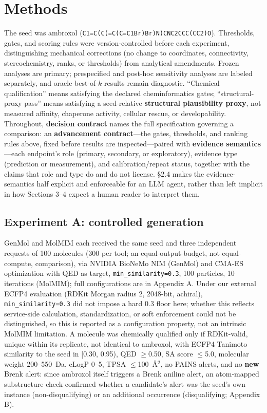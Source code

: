\documentclass{article}
\begin{document}
\section{Methods}

The seed was ambroxol (\texttt{C1=C(C(=C(C=C1Br)Br)N)CNC2CCC(CC2)O}). Thresholds, gates, and scoring rules were version-controlled before each experiment, distinguishing mechanical corrections (no change to coordinates, connectivity, stereochemistry, ranks, or thresholds) from analytical amendments. Frozen analyses are primary; prespecified and post-hoc sensitivity analyses are labeled separately, and oracle best-of-$k$ results remain diagnostic. ``Chemical qualification'' means satisfying the declared cheminformatics gates; ``structural-proxy pass'' means satisfying a seed-relative \textbf{structural plausibility proxy}, not measured affinity, chaperone activity, cellular rescue, or developability. Throughout, \textbf{decision contract} names the full specification governing a comparison: an \textbf{advancement contract}---the gates, thresholds, and ranking rules above, fixed before results are inspected---paired with \textbf{evidence semantics}---each endpoint's role (primary, secondary, or exploratory), evidence type (prediction or measurement), and calibration/repeat status, together with the claims that role and type do and do not license. \S2.4 makes the evidence-semantics half explicit and enforceable for an LLM agent, rather than left implicit in how Sections 3--4 expect a human reader to interpret them.

\subsection{Experiment A: controlled generation}

GenMol and MolMIM each received the same seed and three independent requests of 100 molecules (300 per tool; an equal-output-budget, not equal-compute, comparison), via NVIDIA BioNeMo NIM (GenMol) and CMA-ES optimization with QED as target, \texttt{min\_similarity=0.3}, 100 particles, 10 iterations (MolMIM); full configurations are in Appendix A. Under our external ECFP4 evaluation (RDKit Morgan radius 2, 2048-bit, achiral), \texttt{min\_similarity=0.3} did not impose a hard 0.3 floor here; whether this reflects service-side calculation, standardization, or soft enforcement could not be distinguished, so this is reported as a configuration property, not an intrinsic MolMIM limitation. A molecule was chemically qualified only if RDKit-valid, unique within its replicate, not identical to ambroxol, with ECFP4 Tanimoto similarity to the seed in [0.30, 0.95), QED $\geq$0.50, SA score $\leq$5.0, molecular weight 200--550~Da, cLogP 0--5, TPSA $\leq$100~\AA$^{2}$, no PAINS alerts, and no \textbf{new} Brenk alert: since ambroxol itself triggers a Brenk aniline alert, an atom-mapped substructure check confirmed whether a candidate's alert was the seed's own instance (non-disqualifying) or an additional occurrence (disqualifying; Appendix B).
\end{document}
